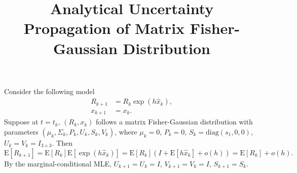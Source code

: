 \documentclass[10pt]{article}
\title{\vspace{-4ex}\textbf{Analytical Uncertainty Propagation of Matrix Fisher-Gaussian Distribution\vspace{-4ex}}}
\date{}
\newcommand{\expect}[1]{\ensuremath{\mathrm{E}\left[ #1 \right]}}
\begin{document}
\maketitle

Consider the following model
\begin{align*}
	R_{k+1} &= R_k\exp(h\hat{x}_k), \\
	x_{k+1} &= x_k.
\end{align*}
Suppose at $t=t_k$, $(R_k,x_k)$ follows a matrix Fisher-Gaussian distribution with parameters $(\mu_k,\Sigma_k,P_k,U_k,S_k,V_k)$, where $\mu_k = 0$, $P_k = 0$, $S_k = \mathrm{diag}(s_1,0,0)$, $U_k=V_k=I_{3\times 3}$.
Then
\begin{equation*}
	\expect{R_{k+1}} = \expect{R_k}\expect{\exp(h\hat{x}_k)} = \expect{R_k}(I+\expect{h\hat{x}_k}+o(h)) = \expect{R_k}+o(h).
\end{equation*}
By the marginal-conditional MLE, $U_{k+1}=U_k=I$, $V_{k+1}=V_k=I$, $S_{k+1}=S_k$.
\end{document}
